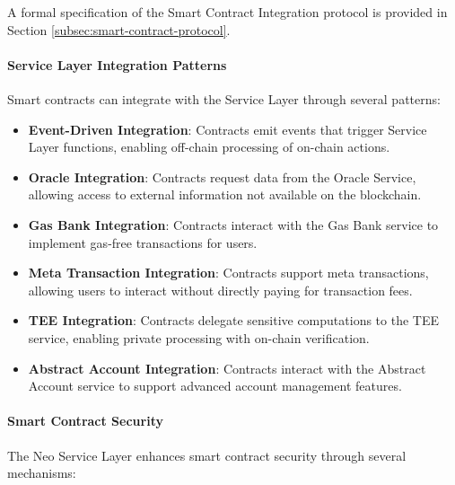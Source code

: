 \documentclass{article}
\begin{document}
A formal specification of the Smart Contract Integration protocol is provided in Section \ref{subsec:smart-contract-protocol}.



\paragraph{Service Layer Integration Patterns}
Smart contracts can integrate with the Service Layer through several patterns:

\begin{itemize}
    \item \textbf{Event-Driven Integration}: Contracts emit events that trigger Service Layer functions, enabling off-chain processing of on-chain actions.
    
    \item \textbf{Oracle Integration}: Contracts request data from the Oracle Service, allowing access to external information not available on the blockchain.
    
    \item \textbf{Gas Bank Integration}: Contracts interact with the Gas Bank service to implement gas-free transactions for users.
    
    \item \textbf{Meta Transaction Integration}: Contracts support meta transactions, allowing users to interact without directly paying for transaction fees.
    
    \item \textbf{TEE Integration}: Contracts delegate sensitive computations to the TEE service, enabling private processing with on-chain verification.
    
    \item \textbf{Abstract Account Integration}: Contracts interact with the Abstract Account service to support advanced account management features.
\end{itemize}

\paragraph{Smart Contract Security}
The Neo Service Layer enhances smart contract security through several mechanisms:
\end{document}

